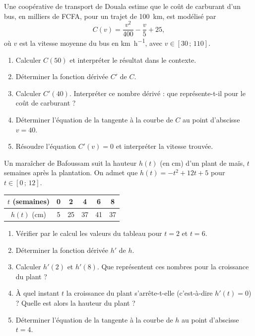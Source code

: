 \documentclass[11pt]{article}
\begin{document}
\begin{exercice}
Une coopérative de transport de Douala estime que le coût de carburant d'un bus, en milliers de FCFA, pour un trajet de \SI{100}{\kilo\metre}, est modélisé par
\[C(v)=\dfrac{v^{2}}{400}-\dfrac{v}{5}+25,\]
où $v$ est la vitesse moyenne du bus en \si{\kilo\metre\per\hour}, avec $v\in[30\,;\,110]$.
\begin{enumerate}
\item Calculer $C(50)$ et interpréter le résultat dans le contexte.
\item Déterminer la fonction dérivée $C'$ de $C$.
\item Calculer $C'(40)$. Interpréter ce nombre dérivé : que représente-t-il pour le coût de carburant ?
\item Déterminer l'équation de la tangente à la courbe de $C$ au point d'abscisse $v=40$.
\item Résoudre l'équation $C'(v)=0$ et interpréter la vitesse trouvée.
\end{enumerate}
\end{exercice}

\begin{exercice}
Un maraîcher de Bafoussam suit la hauteur $h(t)$ (en \si{\centi\metre}) d'un plant de maïs, $t$ semaines après la plantation. On admet que $h(t)=-t^{2}+12t+5$ pour $t\in[0\,;\,12]$.

\begin{center}
\begin{tabular}{|c|c|c|c|c|c|}
\hline
$t$ (semaines) & 0 & 2 & 4 & 6 & 8 \\
\hline
$h(t)$ (\si{\centi\metre}) & 5 & 25 & 37 & 41 & 37 \\
\hline
\end{tabular}
\end{center}

\begin{enumerate}
\item Vérifier par le calcul les valeurs du tableau pour $t=2$ et $t=6$.
\item Déterminer la fonction dérivée $h'$ de $h$.
\item Calculer $h'(2)$ et $h'(8)$. Que représentent ces nombres pour la croissance du plant ?
\item À quel instant $t$ la croissance du plant s'arrête-t-elle (c'est-à-dire $h'(t)=0$) ? Quelle est alors la hauteur du plant ?
\item Déterminer l'équation de la tangente à la courbe de $h$ au point d'abscisse $t=4$.
\end{enumerate}
\end{exercice}
\end{document}
